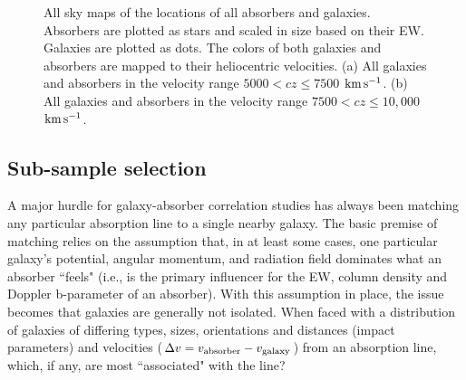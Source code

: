\documentclass[twocolumn,tighten]{aastex62}
\newcommand{\kms}{$\rm km\, s^{-1}$}
\begin{document}
\begin{figure}
\centering
  \label{allsky_7500}
  \label{allsky_10000}
  \caption{\small{All sky maps of the locations of all absorbers and galaxies. Absorbers are plotted as stars and scaled in size based on their EW. Galaxies are plotted as dots. The colors of both galaxies and absorbers are mapped to their heliocentric velocities. (a) All galaxies and absorbers in the velocity range $5000 < cz \leq 7500$ \kms. (b) All galaxies and absorbers in the velocity range $7500 < cz \leq 10,000$ \kms.}}
\vspace{0pt}
\label{allsky_7500-10000}
\end{figure}




\subsection{Sub-sample selection}
A major hurdle for galaxy-absorber correlation studies has always been matching any particular absorption line to a single nearby galaxy. The basic premise of matching relies on the assumption that, in at least some cases, one particular galaxy's potential, angular momentum, and radiation field dominates what an absorber ``feels" (i.e., is the primary influencer for the EW, column density and Doppler b-parameter of an absorber). With this assumption in place, the issue becomes that galaxies are generally not isolated. When faced with a distribution of galaxies of differing types, sizes, orientations and distances (impact parameters) and velocities ($\Delta v = v_{\rm absorber} - v_{\rm galaxy}$) from an absorption line, which, if any, are most ``associated" with the line? 
\end{document}

